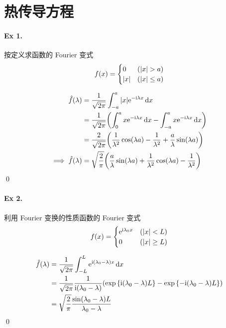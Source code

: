 \section{热传导方程}
\paragraph{Ex 1.}
按定义求函数的 Fourier 变式
\[
f(x) = \begin{cases}0 & ({\lvert {x} \rvert} > a) \\ {\lvert {x} \rvert} & ({\lvert {x} \rvert} \leq a) \end{cases}
\]

\solution
\[ \begin{aligned}
\hat f(\lambda) &= \frac{1}{\sqrt{2\pi}} \int_{-a}^a
 {\lvert {x} \rvert} {\mathrm e}^{-{\mathrm i} \lambda x} \operatorname{d\!} x \\
&= \frac{1}{\sqrt{2\pi}} {\left( {
	\int_0^a x {\mathrm e}^{-{\mathrm i} \lambda x} \operatorname{d\!} x
	-\int_{-a}^a x {\mathrm e}^{-{\mathrm i} \lambda x} \operatorname{d\!} x
} \right)} \\
&= \frac{2}{\sqrt{2\pi}} {\left( {
	\frac{1}{\lambda^2} \cos (\lambda a) - \frac{1}{\lambda^2}
	+\frac{a}{\lambda} \sin (\lambda a)
} \right)} \\
\implies \hat f(\lambda) &= \sqrt{\frac{2}{\pi}} {\left( {
	\frac{a}{\lambda} \sin (\lambda a) + \frac{1}{\lambda^2} \cos (\lambda a)
	- \frac{1}{\lambda^2}
} \right)}
\end{aligned} \]
\qed


\paragraph{Ex 2.}
利用 Fourier 变换的性质函数的 Fourier 变式
\[
f(x)=\begin{cases}{\mathrm e}^{{\mathrm i} \lambda_0 x}&({\lvert {x} \rvert}< L)\\0&({\lvert {x} \rvert}\geq L)\end{cases}
\]

\solution
\[ \begin{aligned}
\hat f(\lambda) &= \frac{1}{\sqrt{2\pi}} \int_{-L}^L
 {\mathrm e}^{{\mathrm i} (\lambda_0 - \lambda) x} \operatorname{d\!} x \\
&= \frac{1}{\sqrt{2\pi}} \frac{1}{{\mathrm i} (\lambda_0 - \lambda)}  {\left( {
	\exp {\left\{ {{\mathrm i}(\lambda_0 - \lambda) L} \right\}}
	-\exp {\left\{ {-{\mathrm i}(\lambda_0 - \lambda) L} \right\}}
} \right)} \\
&= \sqrt{\frac{2}{\pi}} \frac{\sin(\lambda_0 - \lambda) L}{\lambda_0 - \lambda}
\end{aligned} \]
\qed

